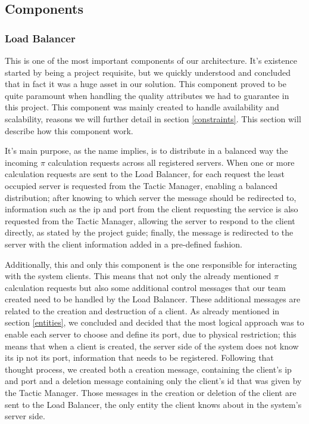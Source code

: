 \documentclass[12pt]{article}
\begin{document}
\subsection{Components} \label{components} %

\subsubsection{Load Balancer} \label{lb}
This is one of the most important components of our architecture. It's existence started by being a project requisite, but we quickly understood and concluded that in fact it was a huge asset in our solution. This component proved to be quite paramount when handling the quality attributes we had to guarantee in this project. This component was mainly created to handle availability and scalability, reasons we will further detail in section \ref{constraints}. This section will describe how this component work.

It's main purpose, as the name implies, is to distribute in a balanced way the incoming $\pi$ calculation requests across all registered servers. When one or more calculation requests are sent to the Load Balancer, for each request the least occupied server is requested from the Tactic Manager, enabling a balanced distribution; after knowing to which server the message should be redirected to, information such as the ip and port from the client requesting the service is also requested from the Tactic Manager, allowing the server to respond to the client directly, as stated by the project guide; finally, the message is redirected to the server with the client information added in a pre-defined fashion.

Additionally, this and only this component is the one responsible for interacting with the system clients. This means that not only the already mentioned $\pi$ calculation requests but also some additional control messages that our team created need to be handled by the Load Balancer. These additional messages are related to the creation and destruction of a client. As already mentioned in section \ref{entities}, we concluded and decided that the most logical approach was to enable each server to choose and define its port, due to physical restriction; this means that when a client is created, the server side of the system does not know its ip not its port, information that needs to be registered. Following that thought process, we created both a creation message, containing the client's ip and port and a deletion message containing only the client's id that was given by the Tactic Manager. Those messages in the creation or deletion of the client are sent to the Load Balancer, the only entity the client knows about in the system's server side.
\end{document}
